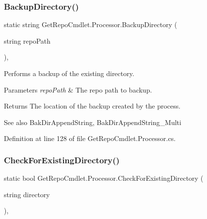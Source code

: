 \subsubsection{\texorpdfstring{Backup\+Directory()}{BackupDirectory()}}
{\footnotesize\ttfamily static string Get\+Repo\+Cmdlet.\+Processor.\+Backup\+Directory (\begin{DoxyParamCaption}\item[{string}]{repo\+Path }\end{DoxyParamCaption})\hspace{0.3cm}{\ttfamily [static]}, {\ttfamily [package]}}



Performs a backup of the existing directory. 


\begin{DoxyParams}{Parameters}
{\em repo\+Path} & The repo path to backup.\\
\hline
\end{DoxyParams}
\begin{DoxyReturn}{Returns}
The location of the backup created by the process.
\end{DoxyReturn}
\begin{DoxySeeAlso}{See also}
Bak\+Dir\+Append\+String, Bak\+Dir\+Append\+String\+\_\+\+Multi


\end{DoxySeeAlso}


Definition at line 128 of file Get\+Repo\+Cmdlet.\+Processor.\+cs.

\mbox{\label{class_get_repo_cmdlet_1_1_processor_ace9c1d574b3758f94c8cf65e7fcddbf3}} 
\subsubsection{\texorpdfstring{Check\+For\+Existing\+Directory()}{CheckForExistingDirectory()}}
{\footnotesize\ttfamily static bool Get\+Repo\+Cmdlet.\+Processor.\+Check\+For\+Existing\+Directory (\begin{DoxyParamCaption}\item[{string}]{directory }\end{DoxyParamCaption})\hspace{0.3cm}{\ttfamily [static]}, {\ttfamily [package]}}



